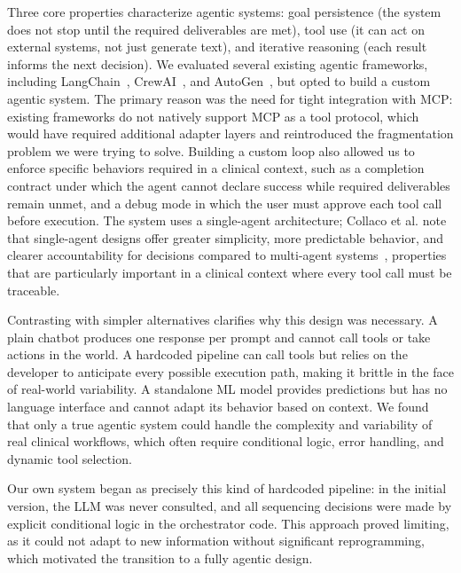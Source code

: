 \documentclass[conference]{IEEEtran}
\begin{document}
Three core properties characterize agentic systems: goal persistence (the system does not stop until the required deliverables are met), tool use (it can act on external systems, not just generate text), and iterative reasoning (each result informs the next decision). We evaluated several existing agentic frameworks, including LangChain~\cite{langchain}, CrewAI~\cite{crewai}, and AutoGen~\cite{autogen}, but opted to build a custom agentic system. The primary reason was the need for tight integration with MCP: existing frameworks do not natively support MCP as a tool protocol, which would have required additional adapter layers and reintroduced the fragmentation problem we were trying to solve. Building a custom loop also allowed us to enforce specific behaviors required in a clinical context, such as a completion contract under which the agent cannot declare success while required deliverables remain unmet, and a debug mode in which the user must approve each tool call before execution. The system uses a single-agent architecture; Collaco et al. note that single-agent designs offer greater simplicity, more predictable behavior, and clearer accountability for decisions compared to multi-agent systems~\cite{collaco2026scoping}, properties that are particularly important in a clinical context where every tool call must be traceable.

Contrasting with simpler alternatives clarifies why this design was necessary.
A plain chatbot produces one response per prompt and cannot call tools or take actions in the world. A hardcoded pipeline can call tools but relies on the developer to anticipate every possible execution path, making it brittle in the face of real-world variability. A standalone ML model provides predictions but has no language interface and cannot adapt its behavior based on context. We found that only a true agentic system could handle the complexity and variability of real clinical workflows, which often require conditional logic, error handling, and dynamic tool selection.

Our own system began as precisely this kind of hardcoded pipeline: in the initial version, the LLM was never consulted, and all sequencing decisions were made by explicit conditional logic in the orchestrator code. This approach proved limiting, as it could not adapt to new information without significant reprogramming, which motivated the transition to a fully agentic design.
\end{document}
